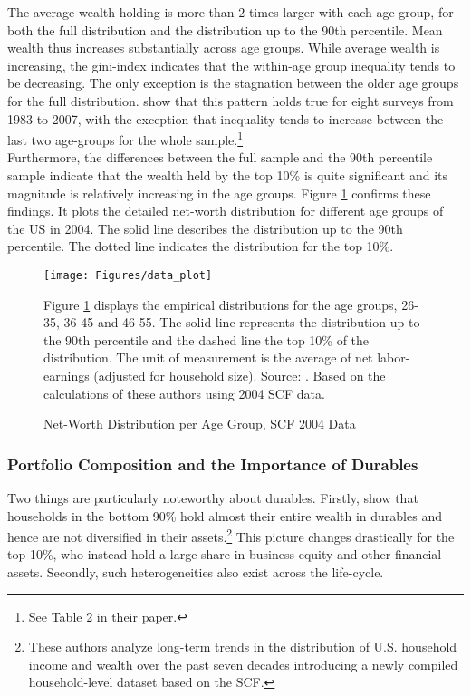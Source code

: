 \documentclass[a4paper,12pt,legno]{article}
\begin{document}
The average wealth holding is more than $2$ times larger with each age group, for both the full distribution and the distribution up to the 90th percentile. Mean wealth thus increases substantially across age groups. While average wealth is increasing, the gini-index indicates that the within-age group inequality tends to be decreasing. The only exception is the stagnation between the older age groups for the full distribution. \cite{hintermaier2011} show that this pattern holds true for eight surveys from 1983 to 2007, with the exception that inequality tends to  increase between the last two age-groups for the whole sample.\footnote{See Table 2 in their paper.} \\
Furthermore, the differences between the full sample and the 90th percentile sample indicate that the wealth held by the top 10\% is quite significant and its magnitude is relatively increasing in the age groups. Figure \ref{scf_data} confirms these findings. It plots the detailed net-worth distribution for different age groups of the US in 2004. The solid line describes the distribution up to the 90th percentile. The dotted line indicates the distribution for the top 10\%. 
\begin{figure}[!htbp]
\caption{Net-Worth Distribution per Age Group, SCF 2004 Data} 
\label{scf_data}	%
\centering
\texttt{[image: Figures/data\_plot]}  %

\begin{minipage}{0.8\linewidth}
\footnotesize{Figure \ref{scf_data} displays the empirical distributions for the age groups, 26-35, 36-45 and 46-55. The solid line represents the distribution up to the 90th percentile and the dashed line the top 10\% of the distribution. The unit of measurement is the average of net labor-earnings (adjusted for household size). Source: \cite{hintermaier2011}. Based on the calculations of these authors using 2004 SCF data. }
\end{minipage}

\end{figure}

\subsubsection{Portfolio Composition and the Importance of Durables}
Two things are particularly noteworthy about durables. Firstly, \cite{kuhn2017income} show that households in the bottom 90\% hold almost their entire wealth in durables and hence are not diversified in their assets.\footnote{These authors analyze long-term trends in the distribution of U.S. household income and wealth over the past seven decades introducing a newly compiled household-level dataset based on the SCF.} This picture changes drastically for the top 10\%, who instead hold a large share in business equity and other financial assets. Secondly, such heterogeneities also exist across the life-cycle. 
\end{document}
